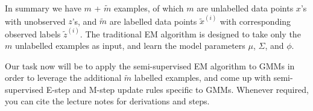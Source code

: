 In summary we have $m$ + $\tilde{m}$ examples, of which $m$ are unlabelled data points $x$'s with unobserved $z$'s, and $\tilde{m}$ are labelled data points $\tilde{x}^{(i)}$ with corresponding observed labels $\tilde{z}^{(i)}$. The traditional EM algorithm is designed to take only the $m$ unlabelled examples as input, and learn the model parameters $\mu$, $\Sigma$, and $\phi$.


Our task now will be to apply the semi-supervised EM algorithm to GMMs in order to leverage the additional $\tilde{m}$ labelled examples, and come up with semi-supervised E-step and M-step update rules specific to GMMs. Whenever required, you can cite the lecture notes for derivations and steps.


\begin{enumerate}
  \setcounter{enumii}{1}
  
  
  
  
  
\end{enumerate}
